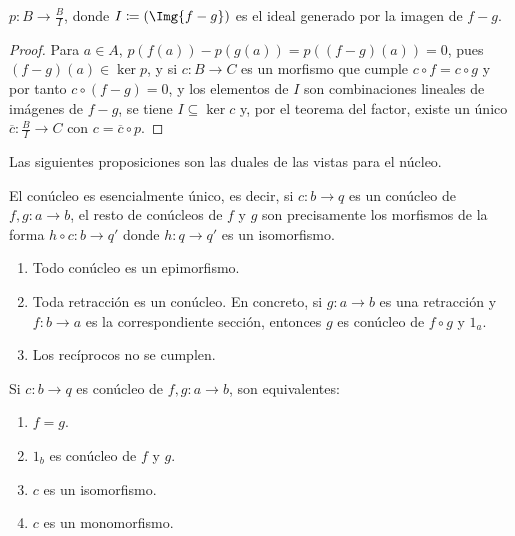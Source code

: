 \begin{example}
\begin{enumerate}
    $p:B\to\frac{B}{I}$, donde $I\coloneqq(\Img{f-g})$ es el ideal generado por
    la imagen de $f-g$.
    \begin{proof}
      Para $a\in A$, $p(f(a))-p(g(a))=p((f-g)(a))=0$, pues $(f-g)(a)\in\ker p$,
      y si $c:B\to C$ es un morfismo que cumple $c\circ f=c\circ g$ y por tanto
      $c\circ (f-g)=0$, y los elementos de $I$ son combinaciones lineales de
      imágenes de $f-g$, se tiene $I\subseteq\ker c$ y, por el teorema del
      factor, existe un único $\overline c:\frac{B}{I}\to C$ con
      $c=\overline c\circ p$.
    \end{proof}
  \end{enumerate}
\end{example}

Las siguientes proposiciones son las duales de las vistas para el núcleo.

\begin{proposition}
  El conúcleo es esencialmente único, es decir, si $c:b\to q$ es un conúcleo de
  $f,g:a\to b$, el resto de conúcleos de $f$ y $g$ son precisamente los
  morfismos de la forma $h\circ c:b\to q'$ donde $h:q\to q'$ es un isomorfismo.
\end{proposition}

\begin{samepage}
  \begin{proposition}\;
    \begin{enumerate}
    \item Todo conúcleo es un epimorfismo.
    \item Toda retracción es un conúcleo. En concreto, si $g:a\to b$ es una
      retracción y $f:b\to a$ es la correspondiente sección, entonces $g$ es
      conúcleo de $f\circ g$ y $1_a$.
    \item Los recíprocos no se cumplen.
    \end{enumerate}
  \end{proposition}
\end{samepage}

\begin{proposition}
  Si $c:b\to q$ es conúcleo de $f,g:a\to b$, son equivalentes:
  \begin{enumerate}
  \item $f=g$.
  \item $1_b$ es conúcleo de $f$ y $g$.
  \item $c$ es un isomorfismo.
  \item $c$ es un monomorfismo.
  \end{enumerate}
\end{proposition}

